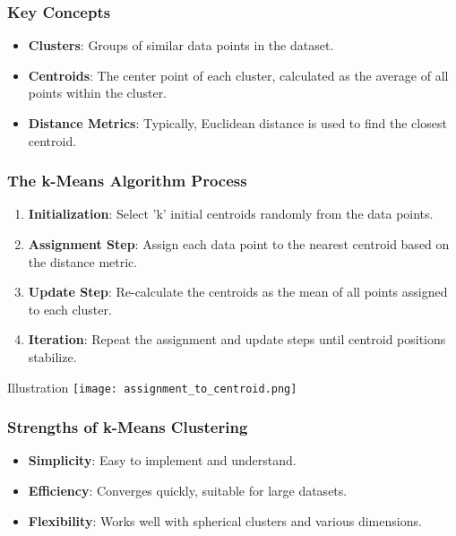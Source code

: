 \documentclass[aspectratio=169]{beamer}
\begin{document}
\begin{frame}[fragile]
    \frametitle{Key Concepts}
    \begin{itemize}
        \item \textbf{Clusters}: Groups of similar data points in the dataset.
        \item \textbf{Centroids}: The center point of each cluster, calculated as the average of all points within the cluster.
        \item \textbf{Distance Metrics}: Typically, Euclidean distance is used to find the closest centroid.
    \end{itemize}
\end{frame}

\begin{frame}[fragile]
    \frametitle{The k-Means Algorithm Process}
    \begin{enumerate}
        \item \textbf{Initialization}: Select 'k' initial centroids randomly from the data points.
        \item \textbf{Assignment Step}: Assign each data point to the nearest centroid based on the distance metric.
        \item \textbf{Update Step}: Re-calculate the centroids as the mean of all points assigned to each cluster.
        \item \textbf{Iteration}: Repeat the assignment and update steps until centroid positions stabilize.
    \end{enumerate}
    \begin{block}{Illustration}
        \texttt{[image: assignment\_to\_centroid.png]} %
        \caption{This illustration demonstrates the assignment of data points to the nearest centroid.}
    \end{block}
\end{frame}

\begin{frame}[fragile]
    \frametitle{Strengths of k-Means Clustering}
    \begin{itemize}
        \item \textbf{Simplicity}: Easy to implement and understand.
        \item \textbf{Efficiency}: Converges quickly, suitable for large datasets.
        \item \textbf{Flexibility}: Works well with spherical clusters and various dimensions.
    \end{itemize}
\end{frame}
\end{document}
